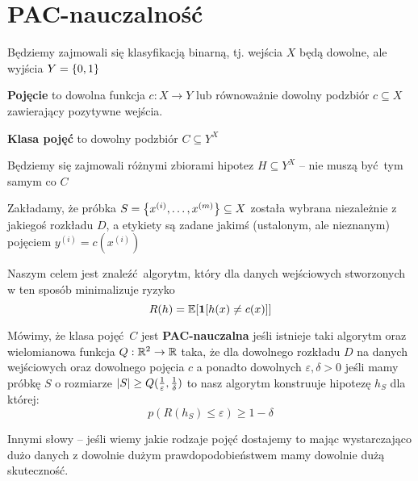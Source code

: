 \section{PAC-nauczalność}

Będziemy zajmowali się klasyfikacją binarną, tj. wejścia \( X \) będą dowolne, ale wyjścia \( Y = \set{0, 1} \)

\begin{definition}
	\textbf{Pojęcie} to dowolna funkcja \( c : X \rightarrow Y \) lub równoważnie dowolny podzbiór \( c \subseteq X \) zawierający pozytywne wejścia.
\end{definition}

\begin{definition}
	\textbf{Klasa pojęć} to dowolny podzbiór \( C \subseteq Y^X \)
\end{definition}

Będziemy się zajmowali różnymi zbiorami hipotez \( H \subseteq Y^X \) -- nie muszą być tym samym co \( C \)

Zakładamy, że próbka \( S = \set{x^{(i)}, \dots, x^{(m)}} \subseteq X \) została wybrana niezależnie z jakiegoś rozkładu \( D \), a etykiety są zadane jakimś (ustalonym, ale nieznanym) pojęciem \( y^{(i)} = c(x^{(i)}) \)

Naszym celem jest znaleźć algorytm, który dla danych wejściowych stworzonych w ten sposób minimalizuje ryzyko
\[
	R(h) = \expected{\indicator{h(x) \neq c(x)}}
\]

\begin{definition}
	Mówimy, że klasa pojęć \( C \) jest \textbf{PAC-nauczalna} jeśli istnieje taki algorytm oraz wielomianowa funkcja \( Q : \mathbb{R}^2 \rightarrow \mathbb{R} \) taka,
	że dla dowolnego rozkładu \( D \) na danych wejściowych oraz dowolnego pojęcia \( c \)
	a ponadto dowolnych \( \varepsilon, \delta > 0\) jeśli mamy próbkę \( S \) o rozmiarze \( \card{S} \geq Q(\frac{1}{\varepsilon}, \frac{1}{\delta}) \) to nasz algorytm konstruuje hipotezę \( h_S \) dla której:
	\[
		p(R(h_S) \leq \varepsilon) \geq 1 - \delta
	\]
\end{definition}

Innymi słowy -- jeśli wiemy jakie rodzaje pojęć dostajemy to mając wystarczająco dużo danych z dowolnie dużym prawdopodobieństwem mamy dowolnie dużą skuteczność.
